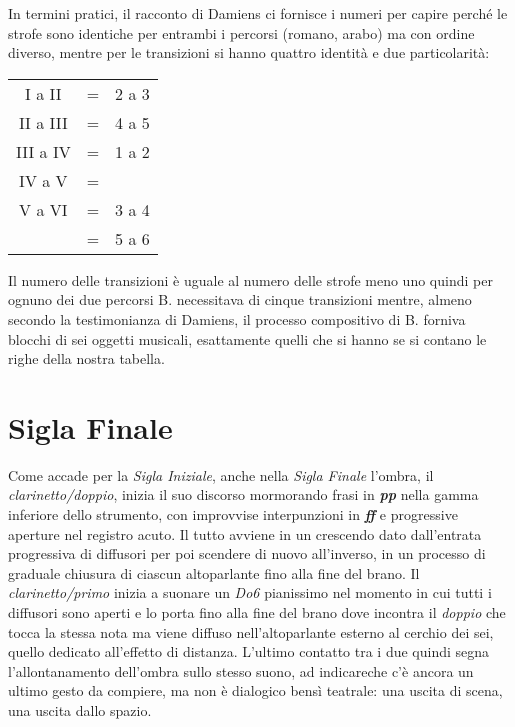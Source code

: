 In termini pratici, il racconto di Damiens ci fornisce i numeri per capire perché le strofe sono identiche per entrambi i percorsi (romano, arabo) ma con ordine diverso, mentre per le transizioni si hanno quattro identità e due particolarità:

\begin{minipage}[t]{0.89\columnwidth}%

\begin{table}[H]
\begin{tabular}{c c c}

I a II 		& = & 2 a 3 \\
II a III	& = & 4 a 5 \\
III a IV	& = & 1 a 2 \\
IV a V		& = &  \\
V a VI		& = & 3 a 4\\
			& = & 5 a 6 \\

\end{tabular}
\end{table}%

\end{minipage}%
\bigskip

Il numero delle transizioni è uguale al numero delle strofe meno uno quindi per ognuno dei due percorsi B. necessitava di cinque transizioni mentre, almeno secondo la testimonianza di Damiens, il processo compositivo di B. forniva blocchi di sei oggetti musicali, esattamente quelli che si hanno se si contano le righe della nostra tabella. 

\section*{Sigla Finale}

Come accade per la \emph{Sigla Iniziale}, anche nella \emph{Sigla Finale} l'ombra, il \emph{clarinetto/doppio}, inizia il suo discorso mormorando frasi in \emph{\textbf{pp}} nella gamma inferiore dello strumento, con improvvise  interpunzioni in \emph{\textbf{ff}} e progressive aperture nel registro acuto. Il tutto avviene in un crescendo dato dall'entrata progressiva di diffusori per poi scendere di nuovo all'inverso, in un processo di graduale chiusura di ciascun altoparlante fino alla fine del brano. Il \emph{clarinetto/primo} inizia a suonare un \emph{Do6} pianissimo  nel momento in cui tutti i diffusori sono aperti e lo porta fino alla fine del brano dove incontra il \emph{doppio} che tocca la stessa nota ma viene diffuso nell'altoparlante esterno al cerchio dei sei, quello dedicato all'effetto di distanza. L'ultimo contatto tra i due quindi segna l'allontanamento dell'ombra sullo stesso suono, ad indicareche c'è ancora un ultimo gesto da compiere, ma non è dialogico bensì teatrale: una uscita di scena, una uscita dallo spazio.


